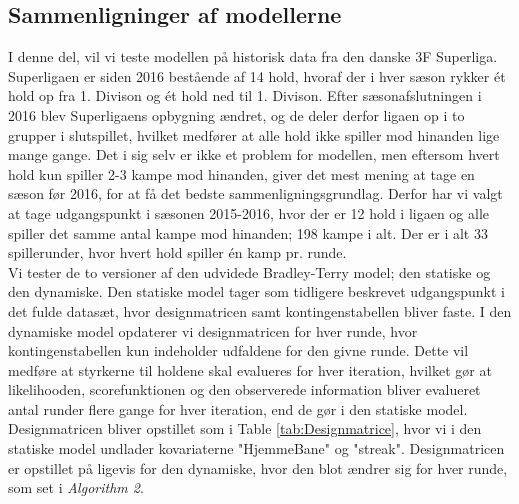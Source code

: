 \documentclass[11pt,a4paper]{article}
\begin{document}
\subsection{Sammenligninger af modellerne}
I denne del, vil vi teste modellen på historisk data fra den danske 3F Superliga. Superligaen er siden 2016 bestående af 14 hold, hvoraf der i hver sæson rykker ét hold op fra 1. Divison og ét hold ned til 1. Divison. Efter sæsonafslutningen i 2016 blev Superligaens opbygning ændret, og de deler derfor ligaen op i to grupper i slutspillet, hvilket medfører at alle hold ikke spiller mod hinanden lige mange gange. Det i sig selv er ikke et problem for modellen, men eftersom hvert hold kun spiller 2-3 kampe mod hinanden, giver det mest mening at tage en sæson før 2016, for at få det bedste sammenligningsgrundlag. Derfor har vi valgt at tage udgangspunkt i sæsonen 2015-2016, hvor der er 12 hold i ligaen og alle spiller det samme antal kampe mod hinanden; 198 kampe i alt. Der er i alt 33 spillerunder, hvor hvert hold spiller én kamp pr. runde.\\
Vi tester de to versioner af den udvidede Bradley-Terry model; den statiske og den dynamiske. Den statiske model tager som tidligere beskrevet udgangspunkt i det fulde datasæt, hvor designmatricen samt kontingenstabellen bliver faste. I den dynamiske model opdaterer vi designmatricen for hver runde, hvor kontingenstabellen kun indeholder udfaldene for den givne runde. Dette vil medføre at styrkerne til holdene skal evalueres for hver iteration, hvilket gør at likelihooden, scorefunktionen og den observerede information bliver evalueret antal runder flere gange for hver iteration, end de gør i den statiske model.\\
Designmatricen bliver opstillet som i Table \ref{tab:Designmatrice}, hvor vi i den statiske model undlader kovariaterne "HjemmeBane" og "streak". Designmatricen er opstillet på ligevis for den dynamiske, hvor den blot ændrer sig for hver runde, som set i \textit{Algorithm 2}.
\end{document}
